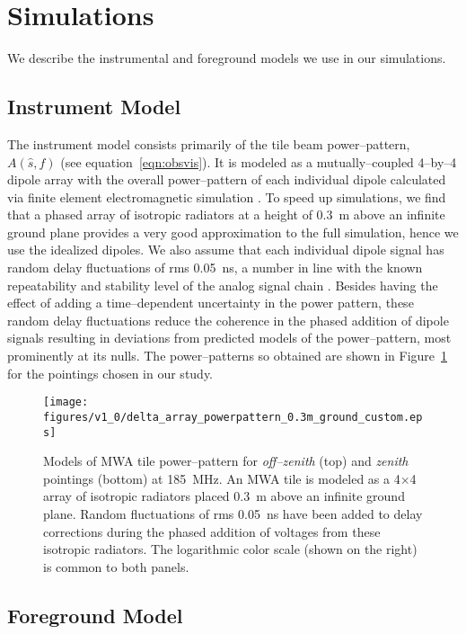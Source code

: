 \documentclass[preprint2,iop,numberedappendix]{emulateapj}
\begin{document}
\section{Simulations}\label{sec:modeling}

We describe the instrumental and foreground models we use in our simulations. 

\subsection{Instrument Model}\label{sec:instrument_model}

The instrument model consists primarily of the tile beam power--pattern, $A(\hat{s},f)$ (see equation~\ref{eqn:obsvis}). It is modeled as a mutually--coupled 4--by--4 dipole array with the overall power--pattern of each individual dipole calculated via finite element electromagnetic simulation \citep{sut14}. To speed up simulations, we find that a phased array of isotropic radiators at a height of 0.3~m above an infinite ground plane provides a very good approximation to the full simulation, hence we use the idealized dipoles. We also assume that each individual dipole signal has random delay fluctuations of rms 0.05~ns, a number in line with the known repeatability and stability level of the analog signal chain \citep{bow07b}. Besides having the effect of adding a time--dependent uncertainty in the power pattern, these random delay fluctuations reduce the coherence in the phased addition of dipole signals resulting in deviations from predicted models of the power--pattern, most prominently at its nulls. The power--patterns so obtained are shown in Figure~\ref{fig:power_pattern} for the pointings chosen in our study.

\begin{figure}[htb]
\centering
\texttt{[image: figures/v1\_0/delta\_array\_powerpattern\_0.3m\_ground\_custom.eps]}
\caption{Models of MWA tile power--pattern for {\it off--zenith} (top) and {\it zenith} pointings (bottom) at 185~MHz. An MWA tile is modeled as a 4$\times$4 array of isotropic radiators placed 0.3~m above an infinite ground plane. Random fluctuations of rms 0.05~ns have been added to delay corrections during the phased addition of voltages from these isotropic radiators. The logarithmic color scale (shown on the right) is common to both panels. \label{fig:power_pattern}}
\end{figure}

\subsection{Foreground Model}\label{sec:foreground}
\end{document}
